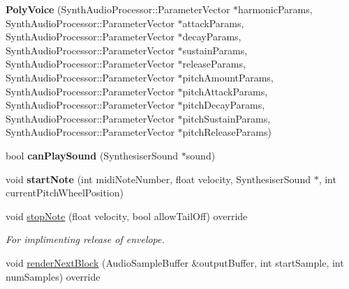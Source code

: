 \begin{DoxyCompactItemize}
\item 
{\bfseries Poly\+Voice} (Synth\+Audio\+Processor\+::\+Parameter\+Vector $\ast$harmonic\+Params, Synth\+Audio\+Processor\+::\+Parameter\+Vector $\ast$attack\+Params, Synth\+Audio\+Processor\+::\+Parameter\+Vector $\ast$decay\+Params, Synth\+Audio\+Processor\+::\+Parameter\+Vector $\ast$sustain\+Params, Synth\+Audio\+Processor\+::\+Parameter\+Vector $\ast$release\+Params, Synth\+Audio\+Processor\+::\+Parameter\+Vector $\ast$pitch\+Amount\+Params, Synth\+Audio\+Processor\+::\+Parameter\+Vector $\ast$pitch\+Attack\+Params, Synth\+Audio\+Processor\+::\+Parameter\+Vector $\ast$pitch\+Decay\+Params, Synth\+Audio\+Processor\+::\+Parameter\+Vector $\ast$pitch\+Sustain\+Params, Synth\+Audio\+Processor\+::\+Parameter\+Vector $\ast$pitch\+Release\+Params)\hypertarget{class_poly_voice_a555b2b828c709b0189ee771182a138c8}{}\label{class_poly_voice_a555b2b828c709b0189ee771182a138c8}

\item 
bool {\bfseries can\+Play\+Sound} (Synthesiser\+Sound $\ast$sound)\hypertarget{class_poly_voice_a7f0ecab501692d7b5cb8818281056d09}{}\label{class_poly_voice_a7f0ecab501692d7b5cb8818281056d09}

\item 
void {\bfseries start\+Note} (int midi\+Note\+Number, float velocity, Synthesiser\+Sound $\ast$, int current\+Pitch\+Wheel\+Position)\hypertarget{class_poly_voice_ad412e89fa7e78f503dd33c4310c74c17}{}\label{class_poly_voice_ad412e89fa7e78f503dd33c4310c74c17}

\item 
void \hyperlink{class_poly_voice_abce53e6f5d9b1fd77cfb561ff72e0934}{stop\+Note} (float velocity, bool allow\+Tail\+Off) override\hypertarget{class_poly_voice_abce53e6f5d9b1fd77cfb561ff72e0934}{}\label{class_poly_voice_abce53e6f5d9b1fd77cfb561ff72e0934}

\begin{DoxyCompactList}\small\item\em For implimenting release of envelope. \end{DoxyCompactList}\item 
void \hyperlink{class_poly_voice_ab104e7e77f632daa0a193fbb91842a17}{render\+Next\+Block} (Audio\+Sample\+Buffer \&output\+Buffer, int start\+Sample, int num\+Samples) override\hypertarget{class_poly_voice_ab104e7e77f632daa0a193fbb91842a17}{}\label{class_poly_voice_ab104e7e77f632daa0a193fbb91842a17}


\end{DoxyCompactItemize}
